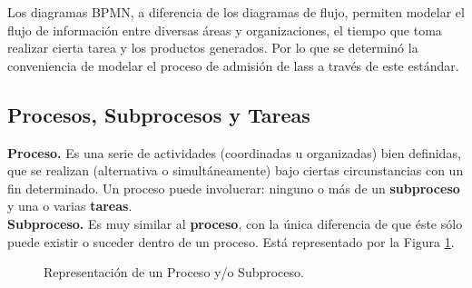 \noindent Los diagramas BPMN, a diferencia de los diagramas de flujo, permiten modelar el flujo de información entre diversas áreas y organizaciones, el tiempo que toma realizar cierta tarea y los productos generados. Por lo que se determinó la conveniencia de modelar el proceso de admisión de lass  a través de este estándar.


\subsection{Procesos, Subprocesos y Tareas}

{\bf Proceso.} Es una serie de actividades (coordinadas u organizadas) bien definidas, que se realizan (alternativa o simultáneamente) bajo ciertas circunstancias con un fin determinado. Un proceso puede involucrar: ninguno o más de un {\bf subproceso} y una o varias {\bf tareas}.\\

{\bf Subproceso.} Es muy similar al {\bf proceso}, con la única diferencia de que éste sólo puede existir o suceder dentro de un proceso. Está representado por la Figura \ref{Intro:iProceso}.\\
 	\begin{figure}[!h]
 	\centering{}%
 	\caption{Representación de un Proceso y/o Subproceso.}
 	\label{Intro:iProceso}
 	\end{figure}

